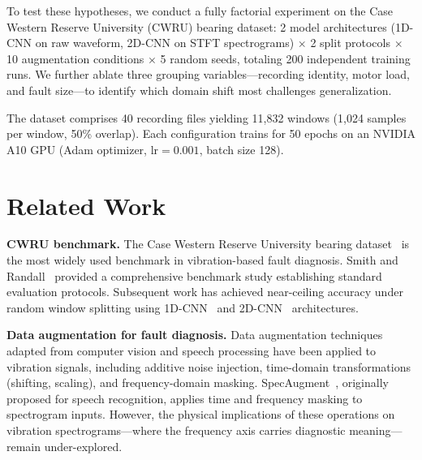 ﻿\documentclass[11pt,a4paper]{article}
\begin{document}
To test these hypotheses, we conduct a fully factorial experiment on the Case Western Reserve University (CWRU) bearing dataset: 2 model architectures (1D-CNN on raw waveform, 2D-CNN on STFT spectrograms) $\times$ 2 split protocols $\times$ 10 augmentation conditions $\times$ 5 random seeds, totaling 200 independent training runs. We further ablate three grouping variables---recording identity, motor load, and fault size---to identify which domain shift most challenges generalization.

The dataset comprises 40 recording files yielding 11,832 windows (1,024 samples per window, 50\% overlap). Each configuration trains for 50 epochs on an NVIDIA A10 GPU (Adam optimizer, $\text{lr}=0.001$, batch size 128).

\section{Related Work}

\textbf{CWRU benchmark.} The Case Western Reserve University bearing dataset~\cite{cwru} is the most widely used benchmark in vibration-based fault diagnosis. Smith and Randall~\cite{smith2015rolling} provided a comprehensive benchmark study establishing standard evaluation protocols. Subsequent work has achieved near-ceiling accuracy under random window splitting using 1D-CNN~\cite{wen2018new} and 2D-CNN~\cite{zhang2017new} architectures.

\textbf{Data augmentation for fault diagnosis.} Data augmentation techniques adapted from computer vision and speech processing have been applied to vibration signals, including additive noise injection, time-domain transformations (shifting, scaling), and frequency-domain masking. SpecAugment~\cite{park2019specaugment}, originally proposed for speech recognition, applies time and frequency masking to spectrogram inputs. However, the physical implications of these operations on vibration spectrograms---where the frequency axis carries diagnostic meaning---remain under-explored.
\end{document}
